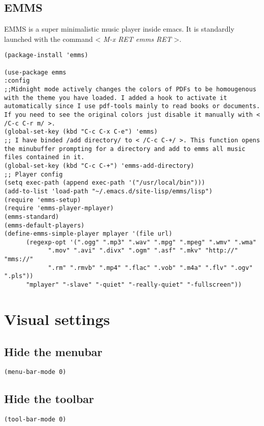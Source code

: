 \documentclass[11pt]{article}
\begin{document}
\subsection{EMMS}
\label{sec:orge1e41c8}
EMMS is a super minimalistic music player inside emacs. It is standardly launched with the command < \emph{M-x RET emms RET} >.
\begin{verbatim}
(package-install 'emms)

(use-package emms
:config 
;;Midnight mode actively changes the colors of PDFs to be homougenous with the theme you have loaded. I added a hook to activate it automatically since I use pdf-tools mainly to read books or documents. If you need to see the original colors just disable it manually with < /C-c C-r m/ >.
(global-set-key (kbd "C-c C-x C-e") 'emms)
;; I have binded /add directory/ to < /C-c C-+/ >. This function opens the minubuffer prompting for a directory and add to emms all music files contained in it.
(global-set-key (kbd "C-c C-+") 'emms-add-directory)
;; Player config
(setq exec-path (append exec-path '("/usr/local/bin")))
(add-to-list 'load-path "~/.emacs.d/site-lisp/emms/lisp")
(require 'emms-setup)
(require 'emms-player-mplayer)
(emms-standard)
(emms-default-players)
(define-emms-simple-player mplayer '(file url)
      (regexp-opt '(".ogg" ".mp3" ".wav" ".mpg" ".mpeg" ".wmv" ".wma"
		    ".mov" ".avi" ".divx" ".ogm" ".asf" ".mkv" "http://" "mms://"
		    ".rm" ".rmvb" ".mp4" ".flac" ".vob" ".m4a" ".flv" ".ogv" ".pls"))
      "mplayer" "-slave" "-quiet" "-really-quiet" "-fullscreen"))
\end{verbatim}
\section{Visual settings}
\label{sec:org7ff4c18}
\subsection{Hide the menubar}
\label{sec:org6b3dfb9}
\begin{verbatim}
(menu-bar-mode 0)
\end{verbatim}

\subsection{Hide the toolbar}
\label{sec:org5581913}
\begin{verbatim}
(tool-bar-mode 0)
\end{verbatim}
\end{document}
